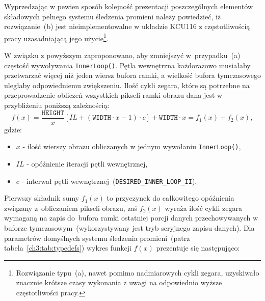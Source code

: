 \begin{enumerate}
Wyprzedzając w pewien sposób kolejność prezentacji poszczególnych elementów składowych pełnego systemu śledzenia promieni należy powiedzieć, iż rozwiązanie~(b) jest nieimplementowalne w układzie KCU116 z częstotliwością pracy uzasadniającą jego użycie\footnote{Rozwiązanie typu~(a), nawet pomimo nadmiarowych cykli zegara, uzyskiwało znacznie krótsze czasy wykonania z uwagi na odpowiednio wyższe częstotliwości pracy.}. 

W związku z powyższym zaproponowano, aby zmniejszyć w~przypadku~(a) częstość wywoływania \texttt{InnerLoop()}. Pętla wewnętrzna każdorazowo musiałaby przetwarzać więcej niż jeden wiersz bufora ramki, a wielkość bufora tymczasowego uległaby odpowiedniemu zwiększeniu. Ilość cykli zegara, które są potrzebne na przeprowadzenie obliczeń wszystkich pikseli ramki obrazu dana jest w przybliżeniu poniższą zależnością:
\begin{equation}
f(x) = \frac{\mathtt{HEIGHT}}{x}\left[IL + \left(\mathtt{WIDTH}\cdot x - 1 \right) \cdot c \right] + \mathtt{WIDTH}\cdot x = f_1(x) + f_2(x),
\label{ch3:eq:dataflow_latency}
\end{equation}
gdzie:
\begin{itemize}
\item[] $x$ - ilość wierszy obrazu obliczanych w jednym wywołaniu \texttt{InnerLoop()},
\item[] $IL$ - opóźnienie iteracji pętli wewnętrznej,
\item[] $c$ - interwał pętli wewnętrznej~(\texttt{DESIRED\_INNER\_LOOP\_II}).
\end{itemize}
Pierwszy składnik sumy $f_1(x)$ to przyczynek do całkowitego opóźnienia związany z~obliczaniem pikseli obrazu, zaś $f_2(x)$ wyraża ilość cykli zegara wymaganą na zapis do~bufora ramki ostatniej porcji danych przechowywanych w buforze tymczasowym~(wykorzystywany jest tryb seryjnego zapisu danych). Dla parametrów domyślnych systemu śledzenia promieni~(patrz tabela~\ref{ch3:tab:typedefs}) wykres funkcji $f(x)$ prezentuje się następująco:



\end{enumerate}

